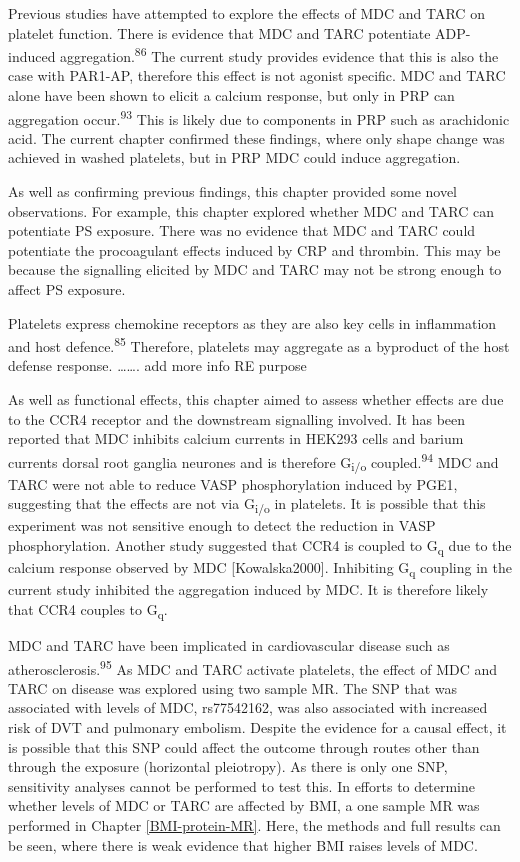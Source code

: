 \documentclass[11pt,twoside]{bristolthesis}
\begin{document}
Previous studies have attempted to explore the effects of MDC and TARC on platelet function. There is evidence that MDC and TARC potentiate ADP-induced aggregation.\textsuperscript{86} The current study provides evidence that this is also the case with PAR1-AP, therefore this effect is not agonist specific. MDC and TARC alone have been shown to elicit a calcium response, but only in PRP can aggregation occur.\textsuperscript{93} This is likely due to components in PRP such as arachidonic acid. The current chapter confirmed these findings, where only shape change was achieved in washed platelets, but in PRP MDC could induce aggregation.

As well as confirming previous findings, this chapter provided some novel observations. For example, this chapter explored whether MDC and TARC can potentiate PS exposure. There was no evidence that MDC and TARC could potentiate the procoagulant effects induced by CRP and thrombin. This may be because the signalling elicited by MDC and TARC may not be strong enough to affect PS exposure.

Platelets express chemokine receptors as they are also key cells in inflammation and host defence.\textsuperscript{85} Therefore, platelets may aggregate as a byproduct of the host defense response. \ldots\ldots. add more info RE purpose

As well as functional effects, this chapter aimed to assess whether effects are due to the CCR4 receptor and the downstream signalling involved. It has been reported that MDC inhibits calcium currents in HEK293 cells and barium currents dorsal root ganglia neurones and is therefore G\textsubscript{i/o} coupled.\textsuperscript{94} MDC and TARC were not able to reduce VASP phosphorylation induced by PGE1, suggesting that the effects are not via G\textsubscript{i/o} in platelets. It is possible that this experiment was not sensitive enough to detect the reduction in VASP phosphorylation. Another study suggested that CCR4 is coupled to G\textsubscript{q} due to the calcium response observed by MDC {[}Kowalska2000{]}. Inhibiting G\textsubscript{q} coupling in the current study inhibited the aggregation induced by MDC. It is therefore likely that CCR4 couples to G\textsubscript{q}.

MDC and TARC have been implicated in cardiovascular disease such as atherosclerosis.\textsuperscript{95} As MDC and TARC activate platelets, the effect of MDC and TARC on disease was explored using two sample MR. The SNP that was associated with levels of MDC, rs77542162, was also associated with increased risk of DVT and pulmonary embolism. Despite the evidence for a causal effect, it is possible that this SNP could affect the outcome through routes other than through the exposure (horizontal pleiotropy). As there is only one SNP, sensitivity analyses cannot be performed to test this. In efforts to determine whether levels of MDC or TARC are affected by BMI, a one sample MR was performed in Chapter \ref{BMI-protein-MR}. Here, the methods and full results can be seen, where there is weak evidence that higher BMI raises levels of MDC.
\end{document}

